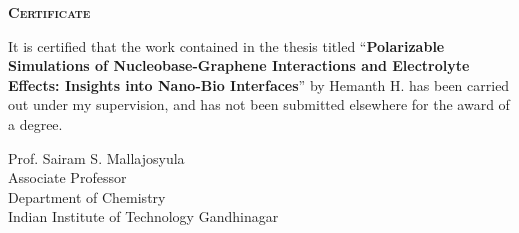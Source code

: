 \thispagestyle{empty}
\begin{center}
    \Large\scshape\textbf{Certificate}
\end{center}
\vspace{1em}

It is certified that the work contained in the thesis titled ``\textbf{Polarizable Simulations of Nucleobase-Graphene Interactions and Electrolyte Effects: Insights into Nano-Bio Interfaces}'' by Hemanth H. has been carried out under my supervision, and has not been submitted elsewhere for the award of a degree.
\vspace{1.5em}
\begin{flushright}
    Prof. Sairam S. Mallajosyula \\
    Associate Professor \\
    Department of Chemistry\\
    Indian Institute of Technology Gandhinagar
\end{flushright}
\afterpage{\blankpage}